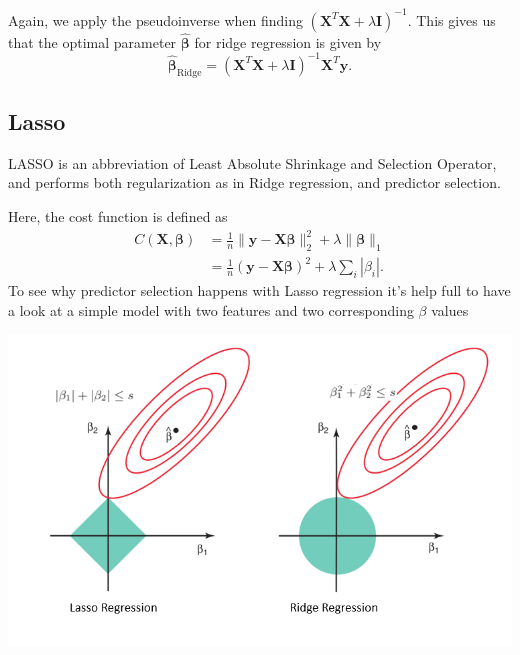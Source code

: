 \documentclass{article}
\begin{document}
Again, we apply the pseudoinverse when finding $(\boldsymbol{X}^T \boldsymbol{X} + \lambda \boldsymbol{I})^{-1}$. This gives us that the optimal parameter $\boldsymbol{\hat{\beta}}$ for ridge regression is given by
\begin{equation*}
    \boldsymbol{\hat{\beta}}_\text{Ridge} = (\boldsymbol{X}^T \boldsymbol{X} + \lambda \boldsymbol{I})^{-1} \boldsymbol{X}^T \boldsymbol{y}.
\end{equation*} 




\subsection{Lasso}
LASSO is an abbreviation of Least Absolute Shrinkage and Selection Operator, and performs both regularization as in Ridge regression, and predictor selection.

Here, the cost function is defined as
\begin{align*}
    C \left( \boldsymbol{X}, \boldsymbol{\beta} \right) &= \frac{1}{n} \lVert \boldsymbol{y} - \boldsymbol{X\beta} \rVert_2^2 + \lambda \lVert \boldsymbol{\beta} \rVert_1 \\
    &= \frac{1}{n} \left( \boldsymbol{y} - \boldsymbol{X\beta} \right)^2 + \lambda \sum_i |\beta_i|.
\end{align*}
To see why predictor selection happens with Lasso regression it's help full to have a look at a simple model with two features and two corresponding $\beta$ values

\begin{center}
    \includegraphics[width=\textwidth]{lasso_ridge_contour.png}
\end{center}
\end{document}
